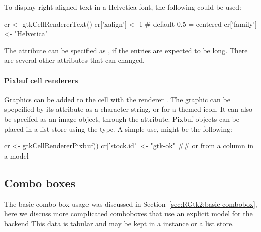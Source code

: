To display right-aligned text in a Helvetica font, the following could be used:
\begin{Schunk}
\begin{Sinput}
 cr <- gtkCellRendererText()
 cr['xalign'] <- 1                       # default 0.5 = centered
 cr['family'] <- "Helvetica"  
\end{Sinput}
\end{Schunk}
The  attribute can be specified as , if the
entries are expected to be long. There are several other attributes that can
changed. 

\paragraph{Pixbuf cell renderers}
Graphics can be added to the cell with the renderer
. The graphic can be spepcified by
its  attribute as a character string, or
 for a themed icon. It can also be specifed as an
image object, through the  attribute. Pixbuf objects can
be placed in a list store using the  type. A simple use,
might be the following:
\begin{Schunk}
\begin{Sinput}
 cr <- gtkCellRendererPixbuf()
 cr['stock.id'] <- "gtk-ok" ## or from a column in a model
\end{Sinput}
\end{Schunk}




\subsection{Combo boxes}
\label{sec:RGtk2:combobox}

The basic combo box usage was discussed in
Section~\ref{sec:RGtk2:basic-combobox}, here we discuss more
complicated comboboxes that use an explicit model for the backend This data is
tabular and may be kept in a  instance or a
list store.  

